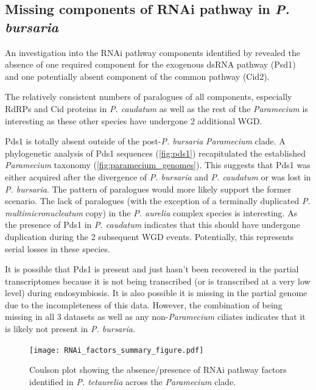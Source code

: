 \subsection{Missing components of RNAi pathway in \textit{P. bursaria}}

An investigation into the RNAi pathway components identified by \citep{Marker2014}
revealed the absence of one required component for the exogenous dsRNA
pathway (Psd1) and one potentially absent component of the common pathway (Cid2).


The relatively consistent numbers of paralogues of all components, especially
RdRPs and Cid proteins in \textit{P. caudatum} as well as the rest of the
\textit{Paramecium} is interesting as these other species have undergone
2 additional WGD. 


Pds1 is totally absent outside of the post-\textit{P. bursaria} 
\textit{Paramecium} clade.
A phylogenetic
analysis of Pds1 sequences (\cref{fig:pds1}) recapitulated the established 
\textit{Paramecium} taxonomy (\cref{fig:paramecium_genomes}).
This suggests that Pds1 was either acquired after the divergence of \textit{P. bursaria}
and \textit{P. caudatum} or was lost in \textit{P. bursaria}.
The pattern of paralogues would more likely support the former scenario.
The lack of paralogues (with the exception of a terminally duplicated \textit{P. multimicronucleatum}
copy) in the \textit{P. aurelia} complex species is interesting.  As the presence
of Pds1 in \textit{P. caudatum} indicates that this should have undergone
duplication during the 2 subsequent WGD events.  Potentially, this represents
serial losses in these species.

It is possible that Pds1 is present and just hasn't been recovered 
in the partial transcriptomes because it is not being transcribed (or is 
transcribed at a very low level) during endosymbiosis.  It is also
possible it is missing in the partial genome due to the incompleteness
of this data.  However, the combination of being missing in all 3 datasets
as well as any non-\textit{Paramecium} ciliates indicates that
it is likely not present in \textit{P. bursaria}.

\begin{figure}
    \centering
    \texttt{[image: RNAi\_factors\_summary\_figure.pdf]}
    \caption[Summary of RNAi Factors in \textit{Paramecium} species]{Coulson plot
        showing the absence/presence of RNAi pathway factors
    identified in \textit{P. tetaurelia} \citep{Marker2014} across the \textit{Paramecium}
clade.}
    \label{fig:rnai_summary}
\end{figure}

